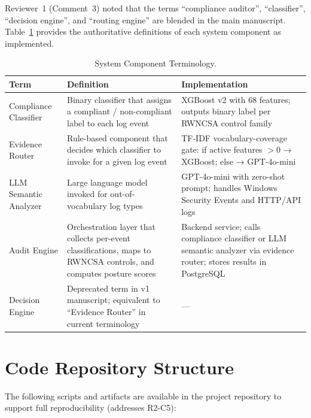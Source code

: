 \documentclass[11pt,a4paper]{article}
\begin{document}
Reviewer~1 (Comment~3) noted that the terms ``compliance auditor'', ``classifier'',
``decision engine'', and ``routing engine'' are blended in the main manuscript.
Table~\ref{tab:terminology} provides the authoritative definitions of each system
component as implemented.

\begin{table}[H]
\centering
\caption{System Component Terminology.}
\label{tab:terminology}
\small
\setlength{\tabcolsep}{5pt}
\begin{tabular}{>{\RaggedRight\arraybackslash}p{2.8cm}
                >{\RaggedRight\arraybackslash}p{5.0cm}
                >{\RaggedRight\arraybackslash}p{5.5cm}}
\toprule
\textbf{Term} & \textbf{Definition} & \textbf{Implementation} \\
\midrule
Compliance Classifier &
  Binary classifier that assigns a compliant / non-compliant label to each log event &
  XGBoost v2 with 68 features; outputs binary label per RWNCSA control family \\
\addlinespace
Evidence Router &
  Rule-based component that decides which classifier to invoke for a given log event &
  TF-IDF vocabulary-coverage gate: if active features $> 0$ → XGBoost; else → GPT-4o-mini \\
\addlinespace
LLM Semantic Analyzer &
  Large language model invoked for out-of-vocabulary log types &
  GPT-4o-mini with zero-shot prompt; handles Windows Security Events and HTTP/API logs \\
\addlinespace
Audit Engine &
  Orchestration layer that collects per-event classifications, maps to RWNCSA controls, and computes posture scores &
  Backend service; calls compliance classifier or LLM semantic analyzer via evidence router; stores results in PostgreSQL \\
\addlinespace
Decision Engine &
  Deprecated term in v1 manuscript; equivalent to ``Evidence Router'' in current terminology &
  — \\
\bottomrule
\end{tabular}
\end{table}

\section{Code Repository Structure}
\label{sec:repo-structure}

The following scripts and artifacts are available in the project repository to support
full reproducibility (addresses R2-C5):
\end{document}
